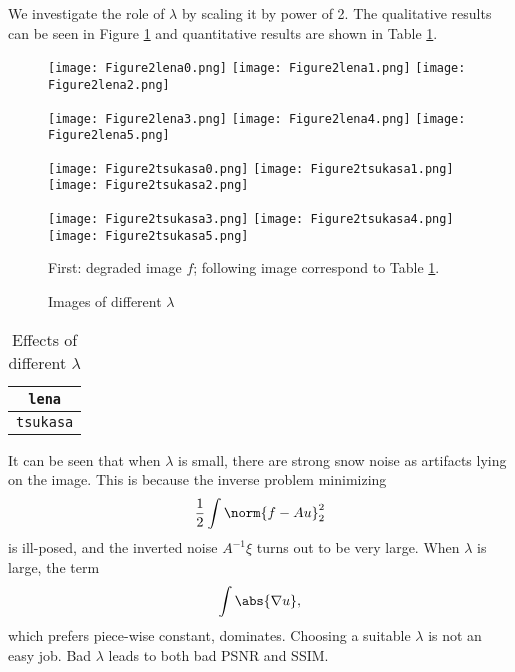 \documentclass[english, nochinese]{pnote}
\begin{document}
We investigate the role of $\lambda$ by scaling it by power of 2. The qualitative results can be seen in Figure \ref{Fig:Lambda} and quantitative results are shown in Table \ref{Tbl:Lambda}.

\begin{figure}[htb]
{
\centering

\texttt{[image: Figure2lena0.png]}
\texttt{[image: Figure2lena1.png]}
\texttt{[image: Figure2lena2.png]}

\texttt{[image: Figure2lena3.png]}
\texttt{[image: Figure2lena4.png]}
\texttt{[image: Figure2lena5.png]}

\texttt{[image: Figure2tsukasa0.png]}
\texttt{[image: Figure2tsukasa1.png]}
\texttt{[image: Figure2tsukasa2.png]}

\texttt{[image: Figure2tsukasa3.png]}
\texttt{[image: Figure2tsukasa4.png]}
\texttt{[image: Figure2tsukasa5.png]}

\caption{Images of different $\lambda$}
\label{Fig:Lambda}
}
{
\footnotesize First: degraded image $f$; following image correspond to Table \ref{Tbl:Lambda}.
}
\end{figure}

\begin{table}[htb]
\centering
\begin{tabular}{|c|c|c|c|c|c|c|}
\hline
\multicolumn{7}{|c|}{\texttt{lena}} \\
\hline

\multicolumn{7}{|c|}{\texttt{tsukasa}} \\
\hline

\end{tabular}
\caption{Effects of different $\lambda$}
\label{Tbl:Lambda}
\end{table}

It can be seen that when $\lambda$ is small, there are strong snow noise as artifacts lying on the image. This is because the inverse problem minimizing
\begin{equation}
\frac{1}{2} \int \norm{ f - A u }_2^2
\end{equation}
is ill-posed, and the inverted noise $ A^{-1} \xi $ turns out to be very large. When $\lambda$ is large, the term
\begin{equation}
\int \abs{ \nabla u },
\end{equation}
which prefers piece-wise constant, dominates. Choosing a suitable $\lambda$ is not an easy job. Bad $\lambda$ leads to both bad PSNR and SSIM.
\end{document}
